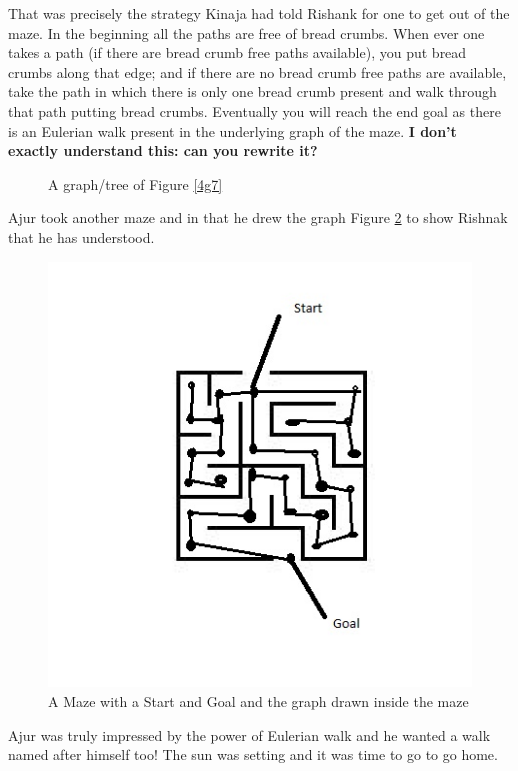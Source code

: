 That was precisely the strategy Kinaja had told Rishank for one to get out of the maze.  In the beginning all the paths are free of bread crumbs. When ever one takes a path (if there are bread crumb free paths available), you put bread crumbs along that edge; and if there are no bread crumb free paths are available, take the path in which there is only one bread crumb present and walk through that path putting bread crumbs. Eventually you will reach the end goal as there is an Eulerian walk present in the underlying graph of the maze. \textbf{I don't exactly understand this: can you rewrite it?}

\begin{figure}
\begin{center}
\caption{ A graph/tree of Figure \ref{4g7}}\label{4g8}
\end{center}
\end{figure}

Ajur took another maze and in that he drew the graph Figure \ref{4g9} to show Rishnak that he has understood.

\begin{figure}
\begin{center}
\includegraphics{anothermaze.jpg}
\caption{A Maze with a Start and Goal and the graph drawn inside the maze}\label{4g9}
\end{center}
\end{figure}
Ajur was truly impressed by the power of Eulerian walk and he wanted a walk named after himself too! The sun was setting and it was time to go to go home.